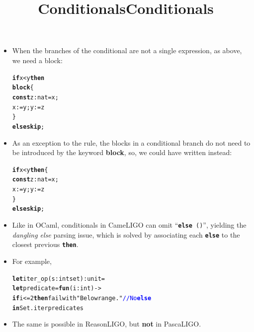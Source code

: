 \documentclass[wide]{slides}
\newcommand{\Kblock}[0]{\textbf{block}\xspace}
\newcommand{\Kconst}[0]{\textbf{const}\xspace}
\newcommand{\Kelse}[0]{\textbf{else}\xspace}
\newcommand{\Kif}[0]{\textbf{if}\xspace}
\newcommand{\Kin}[0]{\textbf{in}\xspace}
\newcommand{\Kskip}[0]{\textbf{skip}\xspace}
\newcommand{\Kthen}[0]{\textbf{then}\xspace}
\newcommand{\Kfun}[0]{\textbf{fun}\xspace}
\newcommand{\Klet}[0]{\textbf{let}\xspace}
\newcommand{\com}[1]{\textcolor{blue}{{#1}}}
\begin{document}
\begin{slide}
  \title{Conditionals}

  \begin{itemize}

    \item When the branches of the conditional are not a single
      expression, as above, we need a block:
      \begin{alltt}
\Kif x < y \Kthen
  \Kblock \{
    \Kconst z : nat = x;
    x := y; y := z
  \}
  \Kelse \Kskip;
      \end{alltt}

    \item As an exception to the rule, the blocks in a conditional
      branch do not need to be introduced by the keyword \Kblock, so,
      we could have written instead:
\begin{alltt}
\Kif x < y \Kthen \{
  \Kconst z : nat = x;
  x := y; y := z
\}
\Kelse \Kskip;
\end{alltt}

  \end{itemize}

\end{slide}

\begin{slide}
  \title{Conditionals}

  \begin{itemize}

    \item Like in OCaml, conditionals in CameLIGO can omit
      ``\texttt{\textbf{else} ()}'', yielding the \emph{dangling else}
      parsing issue, which is solved by associating each
      \texttt{\textbf{else}} to the closest previous
      \texttt{\textbf{then}}.

    \item For example,
            \begin{alltt}
\Klet iter_op (s : int set) : unit =
  \Klet predicate = \Kfun (i : int) ->
     \Kif i <= 2 \Kthen failwith "Below range." \com{// No \Kelse}
  \Kin Set.iter predicate s
            \end{alltt}

    \item The same is possible in ReasonLIGO, but \textbf{not}
      in PascaLIGO.

  \end{itemize}

\end{slide}
\end{document}
